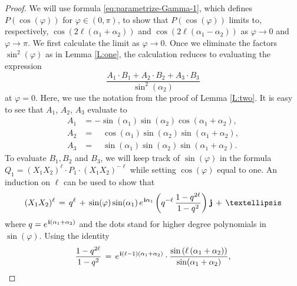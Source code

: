 \documentclass[11pt,reqno]{amsart}
\theoremstyle{definition}
\renewcommand{\phi}{\varphi}
\renewcommand{\i}{\mspace{1.5mu}\mathbf i}
\renewcommand{\j}{\mspace{1.5mu}\mathbf j}
\begin{document}
\begin{sloppypar}
\begin{proof}
We will use formula \eqref{eq:parametrize-Gamma-1}, which defines $P(\cos(\phi))$ for $\phi \in (0,\pi)$, to show that $P(\cos(\phi))$ limits to, respectively, $\cos(2\ell(\alpha_1+\alpha_2))$ and $\cos(2\ell(\alpha_1-\alpha_2))$ as $\phi \to 0$ and $\phi \to \pi$. We first calculate the limit as $\phi \to 0$. Once we eliminate the factors $\sin^2(\phi)$ as in Lemma \ref{L:one}, the calculation reduces to evaluating the expression 
\[
\frac{A_1 \cdot B_1 + A_2 \cdot B_2 + A_3 \cdot B_3}{\sin^2(\alpha_2)}
\]
at $\phi = 0$. Here, we use the notation from the proof of Lemma \ref{L:two}. It is easy to see that $A_1$, $A_2$, $A_3$ evaluate to 
\[
\begin{aligned}
A_1 & = -  \sin(\alpha_1)\sin(\alpha_2)\cos(\alpha_1+\alpha_2), \\
A_2 & =  \quad \cos(\alpha_1)\sin(\alpha_2)\sin(\alpha_1+\alpha_2), \\
A_3 & =  \quad \sin(\alpha_1)\sin(\alpha_2)\sin(\alpha_1+\alpha_2).	
\end{aligned}
\]
To evaluate $B_1, B_2$ and $B_3$, we will keep track of $\sin(\phi)$ in the formula $Q_1 = (X_1X_2)^{\ell}\cdot P_1 \cdot (X_1X_2)^{-\ell}$ while setting $\cos(\phi)$ equal to one. An induction on $\ell$ can be used to show that
\begin{equation}\label{eq:X1X2_power}
(X_1X_2)^{\ell}\, =\, q^{\ell} \,+\, \sin(\phi)\sin(\alpha_1)\,e^{\i \alpha_1}\left(q^{-\ell}\, \frac{1 - q^{2\ell}}{1 - q^2}\right)\j\, +\, \dots
\end{equation}
where $q = e^{\i(\alpha_1+\alpha_2)}$ and the dots stand for higher degree polynomials in $\sin(\phi)$. Using
the identity
\[
\frac{1 - q^{2\ell}}{1 - q^2}\, =\, e^{\i(\ell-1)(\alpha_1+\alpha_2)}\cdot\frac{\sin\left(\ell\left(\alpha_1+\alpha_2\right)\right)}{\sin(\alpha_1+\alpha_2)},
\]


\end{proof}
\end{sloppypar}
\end{document}
